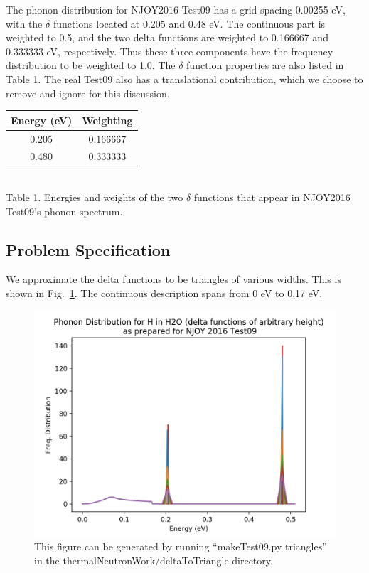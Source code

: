 \documentclass[10pt]{article}
\begin{document}
The phonon distribution for NJOY2016 Test09 has a grid spacing 0.00255 eV, with the $\delta$ functions located at 0.205 and 0.48 eV. The continuous part is weighted to 0.5, and the two delta functions are weighted to 0.166667 and 0.333333 eV, respectively. Thus these three components have the frequency distribution to be weighted to 1.0. The $\delta$ function properties are also listed in Table 1. The real Test09 also has a translational contribution, which we choose to remove and ignore for this discussion.

\begin{center}
\begin{tabular}{ |c|c| }\hline
 Energy (eV)& Weighting\\\hline
 0.205& 0.166667\\\hline
 0.480 & 0.333333 \\\hline
\end{tabular}\\[1ex]
Table 1. Energies and weights of the two $\delta$ functions that appear in NJOY2016 Test09's phonon spectrum.
\end{center}
  
  \subsection*{Problem Specification}
  We approximate the delta functions to be triangles of various widths. This is shown in Fig.~\ref{fig:waterPhononTriangle}. The continuous description spans from 0 eV to 0.17 eV.


            \begin{figure}[H]
              \begin{center}
              \includegraphics[scale=0.5]{waterPhononDistTriangles}
                \caption{This figure can be generated by running ``makeTest09.py triangles'' in the thermalNeutronWork/deltaToTriangle directory.}
              \label{fig:waterPhononTriangle}
              \end{center}
            \end{figure}
\end{document}
